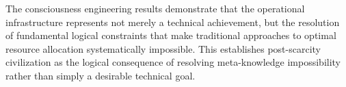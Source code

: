 \documentclass[12pt,a4paper]{article}
\begin{document}
The consciousness engineering results demonstrate that the operational infrastructure represents not merely a technical achievement, but the resolution of fundamental logical constraints that make traditional approaches to optimal resource allocation systematically impossible. This establishes post-scarcity civilization as the logical consequence of resolving meta-knowledge impossibility rather than simply a desirable technical goal.
\end{document}
